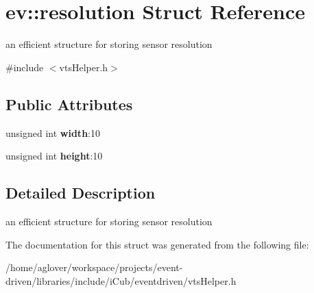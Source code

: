 \hypertarget{structev_1_1resolution}{}\section{ev\+:\+:resolution Struct Reference}
\label{structev_1_1resolution}


an efficient structure for storing sensor resolution  




{\ttfamily \#include $<$vts\+Helper.\+h$>$}

\subsection*{Public Attributes}
\begin{DoxyCompactItemize}
\item 
unsigned int {\bfseries width}\+:10\hypertarget{structev_1_1resolution_af63d9f023bf48b5170fbde6fac1fa60d}{}\label{structev_1_1resolution_af63d9f023bf48b5170fbde6fac1fa60d}

\item 
unsigned int {\bfseries height}\+:10\hypertarget{structev_1_1resolution_ae9919e691ce05e1bbbf281dd79102ddb}{}\label{structev_1_1resolution_ae9919e691ce05e1bbbf281dd79102ddb}

\end{DoxyCompactItemize}


\subsection{Detailed Description}
an efficient structure for storing sensor resolution 

The documentation for this struct was generated from the following file\+:\begin{DoxyCompactItemize}
\item 
/home/aglover/workspace/projects/event-\/driven/libraries/include/i\+Cub/eventdriven/vts\+Helper.\+h\end{DoxyCompactItemize}
